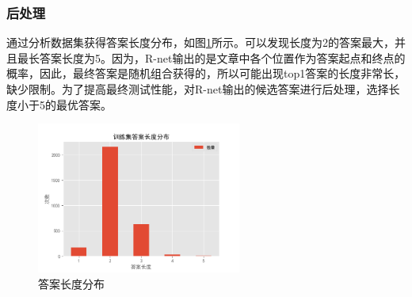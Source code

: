 \documentclass[10pt, a4]{extarticle}
\begin{document}
\subsubsection{后处理}
通过分析数据集获得答案长度分布，如图\ref{length}所示。可以发现长度为2的答案最大，并且最长答案长度为5。因为，R-net输出的是文章中各个位置作为答案起点和终点的概率，因此，最终答案是随机组合获得的，所以可能出现top1答案的长度非常长，缺少限制。为了提高最终测试性能，对R-net输出的候选答案进行后处理，选择长度小于5的最优答案。
\begin{figure}[H]
	\centering
	\includegraphics[width=0.6\textwidth]{figure/length.png}
	\caption{答案长度分布}
	\label{length}
\end{figure}
\end{document}
